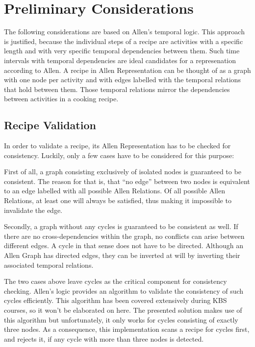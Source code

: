 \chapter{Preliminary Considerations}

    The  following considerations are based on Allen's temporal logic. This
    approach is justified, because the individual steps of a recipe are
    activities with a specific length and with very specific temporal dependencies
    between them. Such time intervals with temporal dependencies are ideal
    candidates for a represenation according to Allen. A
    recipe in Allen Representation can be thought of as a graph with one node
    per activity and with edges
    labelled with the temporal relations that hold between them. Those temporal
    relations mirror the dependencies between activities in a cooking recipe.
    
    \section{Recipe Validation}
    
    In order to validate a recipe, its Allen Representation has to be checked
    for consistency. Luckily, only a few cases have to be considered for this
    purpose:
    
    First of all, a graph consisting exclusively of isolated nodes
    is guaranteed to be consistent. The reason for that is, that ``no edge''
    between two nodes is equivalent to an edge labelled with all possible
    Allen Relations. Of all possible Allen Relations, at least one will always
    be satisfied, thus making it impossible to invalidate the edge.
    
    Secondly, a graph without any cycles is guaranteed to be consistent as well.
    If there are no cross-dependencies within the graph, no conflicts can arise between
    different edges. A cycle in that sense does not have to be directed.
    Although an Allen Graph has directed edges, they can be inverted at will by
    inverting their associated temporal relations.
    
    The two cases above leave cycles as the critical component for consistency
    checking.
    Allen's logic provides an algorithm to validate the consistency of such
    cycles efficiently. This algorithm has been covered extensively during KBS
    courses, so it won't be elaborated on here. The presented solution makes use
    of this algorithm but unfortunately, it only works for cycles consisting of
    exactly three nodes. As a consequence, this implementation scans a recipe for cycles
    first, and rejects it, if any cycle with more than three nodes is detected.
    
